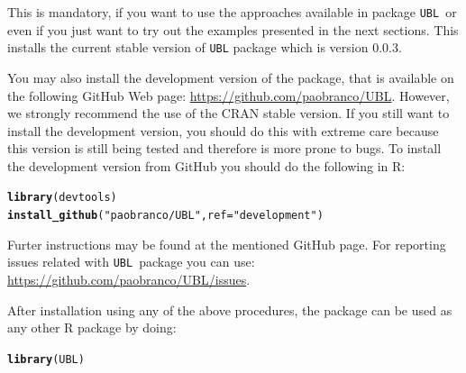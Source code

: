 \documentclass[10pt,a4paper]{article}\usepackage[]{graphicx}\usepackage[]{color}
\makeatletter
\newcommand{\hlstr}[1]{\textcolor[rgb]{0.192,0.494,0.8}{#1}}%
\newcommand{\hlstd}[1]{\textcolor[rgb]{0.345,0.345,0.345}{#1}}%
\newcommand{\hlkwc}[1]{\textcolor[rgb]{0.333,0.667,0.333}{#1}}%
\newcommand{\hlkwd}[1]{\textcolor[rgb]{0.737,0.353,0.396}{\textbf{#1}}}%
\newenvironment{kframe}{%
 \def\at@end@of@kframe{}%
 \ifinner\ifhmode%
  \def\at@end@of@kframe{\end{minipage}}%
  \begin{minipage}{\columnwidth}%
 \fi\fi%
 \def\FrameCommand##1{\hskip\@totalleftmargin \hskip-\fboxsep
 \colorbox{shadecolor}{##1}\hskip-\fboxsep
     \hskip-\linewidth \hskip-\@totalleftmargin \hskip\columnwidth}%
 \MakeFramed {\advance\hsize-\width
   \@totalleftmargin\z@ \linewidth\hsize
   \@setminipage}}%
 {\par\unskip\endMakeFramed%
 \at@end@of@kframe}
\newenvironment{knitrout}{}{} %
\newcommand{\pUBL}{package \texttt{UBL}\ }
\newcommand{\UBLp}{\texttt{UBL}\ package  }
\newcommand{\version}{0.0.3}
\makeatother
\begin{document}
This is mandatory, if you want to use the approaches available in \pUBL or even if you just want to try out the examples presented in the next sections. This installs the current stable version of \texttt{UBL} package which is version \version.

You may also install the development version of the package, that is available on the following GitHub Web page: \url{https://github.com/paobranco/UBL}. However, we strongly recommend the use of the CRAN stable version. If you still want to install the development version, you should do this with extreme care because this version is still being tested and therefore is more prone to bugs.
To install the development version from GitHub you should do the following in R:

\begin{knitrout}\footnotesize
{}\color{fgcolor}\begin{kframe}
\begin{alltt}
\hlkwd{library}\hlstd{(devtools)}
\hlkwd{install_github}\hlstd{(}\hlstr{"paobranco/UBL"}\hlstd{,}\hlkwc{ref}\hlstd{=}\hlstr{"development"}\hlstd{)}
\end{alltt}
\end{kframe}
\end{knitrout}

Furter instructions may be found at the mentioned GitHub page. 
For reporting issues related with \UBLp you can use: \url{https://github.com/paobranco/UBL/issues}.


After installation using any of the above procedures, the package can be used as any other R package by doing:

\begin{knitrout}\footnotesize
{}\color{fgcolor}\begin{kframe}
\begin{alltt}
\hlkwd{library}\hlstd{(UBL)}
\end{alltt}
\end{kframe}
\end{knitrout}

\end{document}
